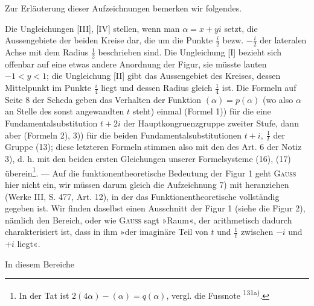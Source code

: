 \par
Zur Erläuterung dieser Aufzeichnungen bemerken wir folgendes.

Die Ungleichungen [III], [IV] stellen, wenn man \(\alpha=x+yi\) setzt, die
Aussengebiete der beiden Kreise dar, die um die Punkte \(\frac i2\) bezw. \(-\frac i2\) der
lateralen Achse mit dem Radius \(\frac12\) beschrieben sind. Die Ungleichung [I]
bezieht sich offenbar auf eine etwas andere Anordnung der Figur, sie müsste
lauten \(-1<y<1\); die Ungleichung [II] gibt das Aussengebiet des Kreises,
dessen Mittelpunkt im Punkte \(\frac i4\) liegt und dessen Radius gleich \(\frac14\) ist. Die
Formeln auf Seite 8 der Scheda geben das Verhalten der Funktion \((\alpha)=p(\alpha)\)
(wo also \(\alpha\) an Stelle des sonst angewandten \(t\) steht) einmal (Formel 1)) für
die eine Fundamentalsubstitution \(t+2i\) der Hauptkongruenzgruppe zweiter
Stufe, dann aber (Formeln 2), 3)) für die beiden Fundamentalsubstitutionen
\(t+i,\ \frac1t\) der Gruppe (13); diese letzteren Formeln stimmen also mit den des
Art. 6 der Notiz 3), d. h. mit den beiden ersten Gleichungen unserer Formelsysteme (16),
(17) überein\footnote{In der Tat ist \(2(4\alpha)-(\alpha)=q(\alpha)\), vergl. die Fussnote \textsuperscript{131a)}.}. — Auf die funktionentheoretische Bedeutung der Figur 1 geht \textsc{Gauss} hier
nicht ein, wir müssen darum gleich die Aufzeichnung 7) mit heranziehen (Werke III,
S. 477, Art. 12), in der das Funktionentheoretische vollständig gegeben ist. Wir finden
daselbst einen Ausschnitt der Figur 1 (siehe die Figur 2), nämlich den Bereich, oder wie \textsc{Gauss}
sagt »Raum«, der arithmetisch dadurch charakterisiert ist, dass in ihm »der
imaginäre Teil von \(t\) und \(\frac1t\) zwischen \(-i\) und \(+i\) liegt«.
\begin{center}
\end{center}
\noindent In diesem Bereiche\par
\clearpage{}
